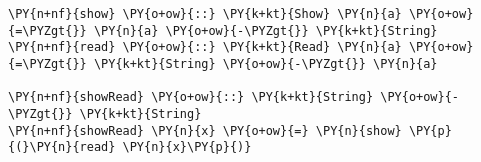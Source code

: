 \begin{Verbatim}[commandchars=\\\{\}]
\PY{n+nf}{show} \PY{o+ow}{::} \PY{k+kt}{Show} \PY{n}{a} \PY{o+ow}{=\PYZgt{}} \PY{n}{a} \PY{o+ow}{-\PYZgt{}} \PY{k+kt}{String}
\PY{n+nf}{read} \PY{o+ow}{::} \PY{k+kt}{Read} \PY{n}{a} \PY{o+ow}{=\PYZgt{}} \PY{k+kt}{String} \PY{o+ow}{-\PYZgt{}} \PY{n}{a}

\PY{n+nf}{showRead} \PY{o+ow}{::} \PY{k+kt}{String} \PY{o+ow}{-\PYZgt{}} \PY{k+kt}{String}
\PY{n+nf}{showRead} \PY{n}{x} \PY{o+ow}{=} \PY{n}{show} \PY{p}{(}\PY{n}{read} \PY{n}{x}\PY{p}{)}
\end{Verbatim}
